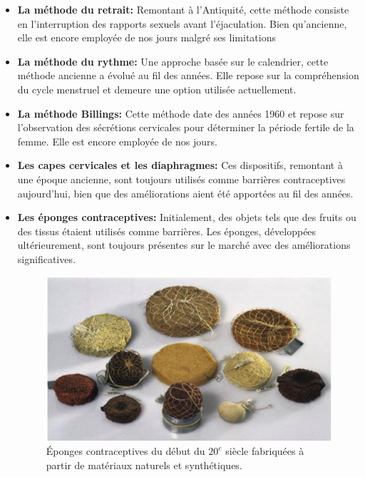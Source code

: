 \begin{itemize}[label={$\bullet$}, align=right]
  \item \textbf{La méthode du retrait:} Remontant à l'Antiquité, cette méthode consiste en l'interruption des rapports sexuels avant l'éjaculation. Bien qu'ancienne, elle est encore employée de nos jours malgré ses limitations \vspace*{0.5em}

  \item \textbf{La méthode du rythme:} Une approche basée sur le calendrier, cette méthode ancienne a évolué au fil des années. Elle repose sur la compréhension du cycle menstruel et demeure une option utilisée actuellement. \vspace*{0.5em}

  \item \textbf{La méthode Billings: }Cette méthode date des années 1960 et repose sur l'observation des sécrétions cervicales pour déterminer la période fertile de la femme. Elle est encore employée de nos jours. \vspace*{0.5em}

  \item \textbf{Les capes cervicales et les diaphragmes: }Ces dispositifs, remontant à une époque ancienne, sont toujours utilisés comme barrières contraceptives aujourd'hui, bien que des améliorations aient été apportées au fil des années.\vspace*{0.5em}

  \item \textbf{Les éponges contraceptives: }Initialement, des objets tels que des fruits ou des tissus étaient utilisés comme barrières. Les éponges, développées ultérieurement, sont toujours présentes sur le marché avec des améliorations significatives.\vspace*{0.5em}

  \begin{figure}[H]
    \centering
    \includegraphics[scale=0.27]{Images/fig_9.jpg}
    \caption[short]{Éponges contraceptives du début du $20^e$ siècle fabriquées à partir de matériaux naturels et synthétiques.}
  \end{figure}
  

\end{itemize}
